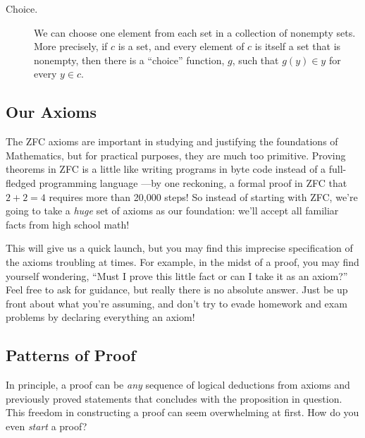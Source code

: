 {\begin{description}
\item[Choice.]  We can choose one element from each set in a collection of
  nonempty sets.  More precisely, if $c$ is a set, and every element
  of $c$ is itself a set that is nonempty, then there is a ``choice''
  function, $g$, such that $g(y) \in y$ for every $y \in c$.

\iffalse
\[
\exists y \forall z \forall w (
    (z \in w \wedge w \in x) \implies
    \exists v \exists u (\exists t ((u \in w \wedge w \in t) \wedge
                                       (u \in t \wedge t \in y))
    \iff u = v))
\]
\fi

\end{description}}


\subsection{Our Axioms}

The ZFC axioms are important in studying and justifying the foundations of
Mathematics, but for practical purposes, they are much too primitive.
Proving theorems in ZFC is a little like writing programs in byte code
instead of a full-fledged programming language ---by one reckoning, a
formal proof in ZFC that $2 + 2 = 4$ requires more than 20,000 steps!  So
instead of starting with ZFC, we're going to take a \textit{huge} set of
axioms as our foundation: we'll accept all familiar facts from high school
math!

This will give us a quick launch, but you may find this imprecise
specification of the axioms troubling at times.  For example, in the midst
of a proof, you may find yourself wondering, ``Must I prove this little
fact or can I take it as an axiom?''  Feel free to ask for guidance, but
really there is no absolute answer.  Just be up front about what you're
assuming, and don't try to evade homework and exam problems by declaring
everything an axiom!

\subsection{Patterns of Proof}

In principle, a proof can be \textit{any} sequence of logical
deductions from axioms and previously proved statements that concludes
with the proposition in question.  This freedom in constructing a
proof can seem overwhelming at first.  How do you even \textit{start}
a proof?

